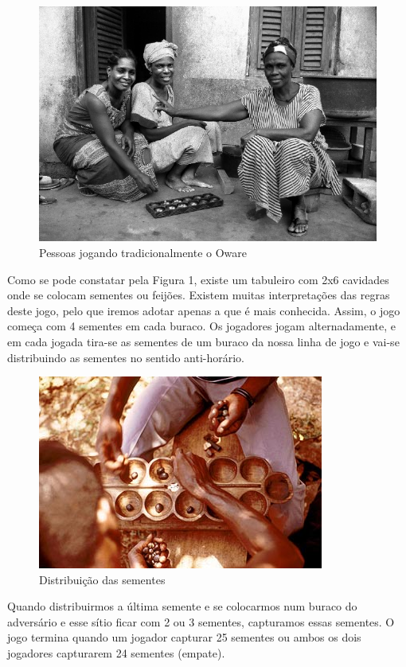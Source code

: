 \documentclass[15pt,a4paper]{article}
\begin{document}
\begin{figure}[h!]
\begin{center}
\includegraphics[scale=20]{awale.jpg}
\caption{Pessoas jogando tradicionalmente o Oware}
\label{fig:traditional}
\end{center}
\end{figure}

Como se pode constatar pela Figura 1, existe um tabuleiro com 2x6 cavidades onde se colocam sementes ou feijões. Existem muitas interpretações das regras deste jogo, pelo que iremos adotar apenas a que é mais conhecida. Assim, o jogo começa com 4 sementes em cada buraco. Os jogadores jogam alternadamente, e em cada jogada tira-se as sementes de um buraco da nossa linha de jogo e vai-se distribuindo as sementes no sentido anti-horário.
\begin{figure}[H]
\begin{center}
\includegraphics[scale=0.5]{oware.jpg}
\caption{Distribuição das sementes}
\label{fig:peoplePlaying}
\end{center}
\end{figure}
 \indent Quando distribuirmos a última semente e se colocarmos num buraco do adversário e esse sítio ficar com 2 ou 3 sementes, capturamos essas sementes. O jogo termina quando um jogador capturar 25 sementes ou ambos os dois jogadores capturarem 24 sementes (empate).
\end{document}
